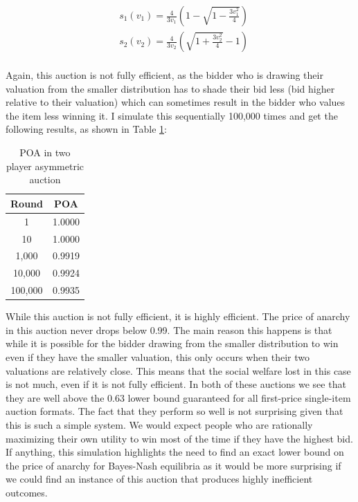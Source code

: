 \documentclass[12pt,twoside]{reedthesis}
\begin{document}
\begin{align*}
&s_1(v_1) = \frac{4}{3 v_1} \left(1 - \sqrt{1 - \frac{3v_1^2}{4}}\right)\\
&s_2(v_2) = \frac{4}{3 v_2} \left(\sqrt{1 + \frac{3v_2^2}{4}} - 1 \right)\\
\end{align*}

Again, this auction is not fully efficient, as the bidder who is drawing their valuation from the smaller distribution has to shade their bid less (bid higher relative to their valuation) which can sometimes result in the bidder who values the item less winning it. I simulate this sequentially 100,000 times and get the following results, as shown in Table \ref{table:2}:
\begin{table}[h!]
	\begin{center}
		\begin{tabular}{ |c|c| }
			\hline
			Round & POA \\
			\hline
			1 & 1.0000 \\
			10 & 1.0000 \\
			1,000 & 0.9919 \\
			10,000 & 0.9924 \\
			100,000 & 0.9935 \\
			\hline
		\end{tabular}
		\caption{POA in two player asymmetric auction}
		\label{table:2}
	\end{center} 
\end{table}

While this auction is not fully efficient, it is highly efficient. The price of anarchy in this auction never drops below 0.99. The main reason this happens is that while it is possible for the bidder drawing from the smaller distribution to win even if they have the smaller valuation, this only occurs when their two valuations are relatively close. This means that the social welfare lost in this case is not much, even if it is not fully efficient. In both of these auctions we see that they are well above the $0.63$ lower bound guaranteed for all first-price single-item auction formats. The fact that they perform so well is not surprising given that this is such a simple system. We would expect people who are rationally maximizing their own utility to win most of the time if they have the highest bid. If anything, this simulation highlights the need to find an exact lower bound on the price of anarchy for Bayes-Nash equilibria as it would be more surprising if we could find an instance of this auction that produces highly inefficient outcomes.
\end{document}
